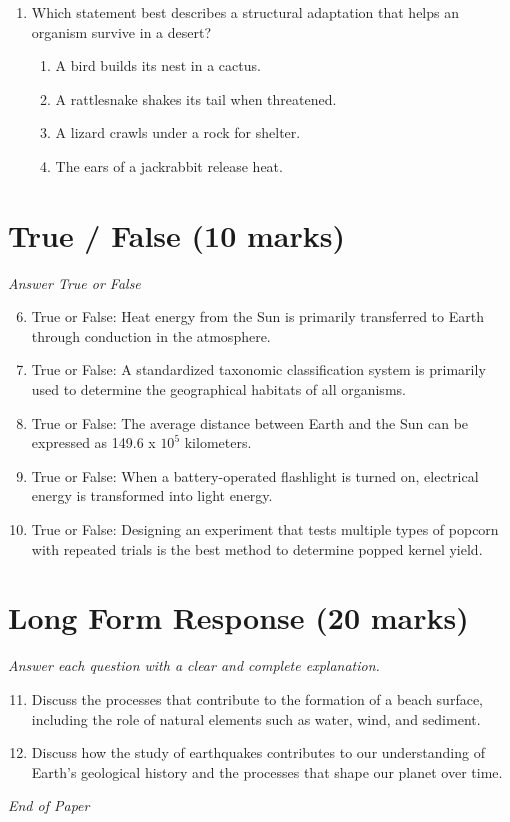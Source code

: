 \documentclass[12pt]{article}
\begin{document}
\begin{enumerate}[label=\arabic*.]
\begin{enumerate}[label=(\alph*)]
    \item size
    \item shape
    \item weight
    \item hardness
\end{enumerate}
\item Which statement best describes a structural adaptation that helps an organism survive in a desert?
\begin{enumerate}[label=(\alph*)]
    \item A bird builds its nest in a cactus.
    \item A rattlesnake shakes its tail when threatened.
    \item A lizard crawls under a rock for shelter.
    \item The ears of a jackrabbit release heat.
\end{enumerate}
\end{enumerate}

\section*{True / False (10 marks)}
\textit{Answer True or False}
\begin{enumerate}[label=\arabic*.]
\setcounter{enumi}{5}
\item True or False: Heat energy from the Sun is primarily transferred to Earth through conduction in the atmosphere.
\item True or False: A standardized taxonomic classification system is primarily used to determine the geographical habitats of all organisms.
\item True or False: The average distance between Earth and the Sun can be expressed as 149.6 x $10^5$ kilometers.
\item True or False: When a battery-operated flashlight is turned on, electrical energy is transformed into light energy.
\item True or False: Designing an experiment that tests multiple types of popcorn with repeated trials is the best method to determine popped kernel yield.
\end{enumerate}

\section*{Long Form Response (20 marks)}
\textit{Answer each question with a clear and complete explanation.}
\begin{enumerate}[label=\arabic*.]
\setcounter{enumi}{10}
\item Discuss the processes that contribute to the formation of a beach surface, including the role of natural elements such as water, wind, and sediment.
\item Discuss how the study of earthquakes contributes to our understanding of Earth's geological history and the processes that shape our planet over time.
\end{enumerate}

\vfill
\noindent\textit{End of Paper}
\end{document}
